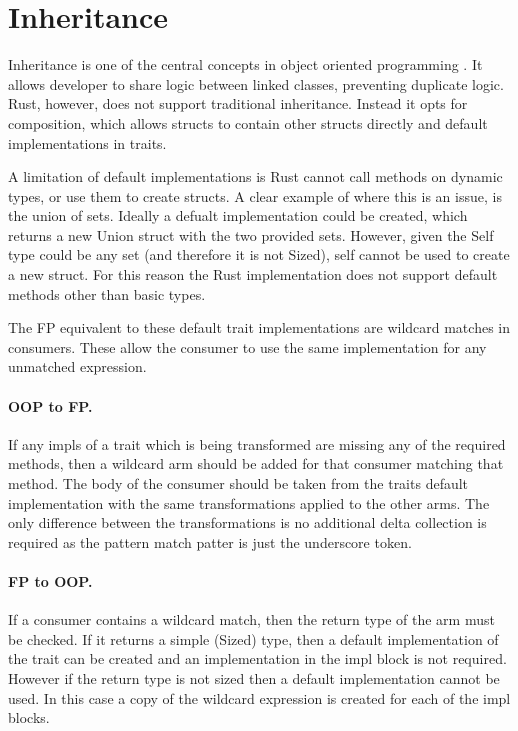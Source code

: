 \documentclass[ oneside,%
                    author={James Elgar},
                    degree={MEng},
                     title={Bidirectional transformer between functional and \\ object-oriented programming in Rust},
                  subtitle={}]{dissertation}
\begin{document}


\section{Inheritance}
\label{sec:inheritance}

Inheritance is one of the central concepts in object oriented programming \cite{cook_palsberg_1989}. It allows developer to share logic between linked classes, preventing duplicate logic. Rust, however, does not support traditional inheritance. Instead it opts for composition, which allows structs to contain other structs directly and default implementations in traits.

A limitation of default implementations is Rust cannot call methods on dynamic types, or use them to create structs.
A clear example of where this is an issue, is the union of sets. Ideally a defualt implementation could be created, which returns a new Union struct with the two provided sets. However, given the Self type could be any set (and therefore it is not Sized), self cannot be used to create a new struct. For this reason the Rust implementation does not support default methods other than basic types.

The FP equivalent to these default trait implementations are wildcard matches in consumers. These allow the consumer to use the same implementation for any unmatched expression.

\paragraph{OOP to FP.} If any impls of a trait which is being transformed are missing any of the required methods, then a wildcard arm should be added for that consumer matching that method. The body of the consumer should be taken from the traits default implementation with the same transformations applied to the other arms. The only difference between the transformations is no additional delta collection is required as the pattern match patter is just the underscore token. 

\paragraph{FP to OOP.} If a consumer contains a wildcard match, then the return type of the arm must be checked. If it returns a simple (Sized) type, then a default implementation of the trait can be created and an implementation in the impl block is not required. However if the return type is not sized then a default implementation cannot be used. In this case a copy of the wildcard expression is created for each of the impl blocks. 
\end{document}
